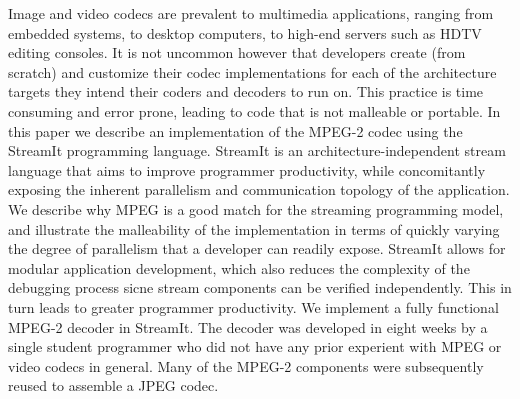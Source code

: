 Image and video codecs are prevalent to  multimedia applications,
ranging from embedded systems, to desktop computers, to high-end
servers such as HDTV editing consoles. It is  not uncommon however
that developers create (from scratch) and customize their codec
implementations for each of the architecture targets they intend their
coders and decoders to run on. This practice is time consuming and
error prone, leading to code that is not malleable or portable.  In
this paper we describe an implementation of the MPEG-2 codec using the
StreamIt programming language. StreamIt is an architecture-independent
stream language that aims to improve programmer productivity, while
concomitantly exposing the inherent parallelism and communication
topology of the application.  We describe why MPEG is a good match for
the streaming programming model, and illustrate the malleability of
the implementation in terms of quickly varying the degree of
parallelism that a developer can readily expose. StreamIt allows for
modular application development, which also reduces the complexity of
the debugging process sicne stream components can be verified
independently. This in turn leads to greater programmer productivity.
We implement a fully functional MPEG-2 decoder in StreamIt. The
decoder was developed in eight weeks by a single student programmer
who did not have any prior experient with MPEG or video codecs in
general. Many of the MPEG-2 components were subsequently reused to
assemble a JPEG codec.

